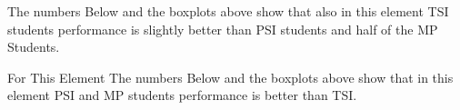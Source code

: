 \documentclass[12pt]{extreport}
\begin{document}
The numbers Below and the boxplots above show that also in this element  TSI students performance is slightly better than PSI students and half of the MP Students.

For This Element The numbers Below and the boxplots above show that in this element  PSI and MP students performance is  better than TSI.

\begin{comment}
\subparagraph{Interpretation of the Box-plots:}
For This Element 

\begin{enumerate}	
	\item The MP Class Box-Plot:
	\begin{enumerate}
		\item MAX = a {} {} {} {} {} {} {} {} UQ = b {} {} {} {} {} {} {} {} Median = c
		\item LQ = d {} {} {} {} {} {} {} {}  MIN =	l {} {} {} {} {} {} {} {}  IQR = e - f = g
	\end{enumerate}
	\item The PSI Class Box-Plot:
	\begin{enumerate}
		\item MAX = a {} {} {} {} {} {} {} {} UQ = b {} {} {} {} {} {} {} {} Median = c
		\item LQ = d {} {} {} {} {} {} {} {}  MIN =	e {} {} {} {} {} {} {} {} IQR = f - g = h	
	\end{enumerate}
	\item The TSI Class Box-Plot:
	\begin{enumerate}
		\item MAX = a {} {} {} {} {} {} {} {} UQ = b {} {} {} {} {} {} {} {} Median = c
		\item LQ = d {} {} {} {} {} {} {} {} MIN = e {} {} {} {} {} {} {} {} IQR = f - g = h	
	\end{enumerate}
\end{enumerate}


\subparagraph{Interpretation of the histogram:}
This Frequency Distribution is (Skeness) with the following descriptive statistics:
\begin{enumerate}
	\item Mean =  
	\item STD = 
	\item Range = a - b = c
	\item IQR = a - b = c 
\end{enumerate}
\end{comment}
\end{document}
